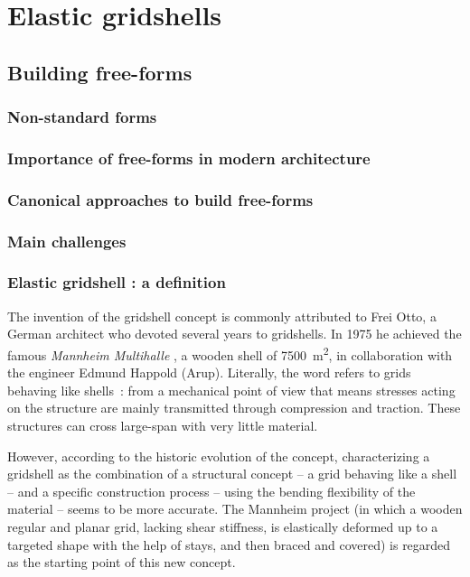 
\chapter{Elastic gridshells}


\section{Building free-forms}
\subsection{Non-standard forms}
\subsection{Importance of free-forms in modern architecture}
\subsection{Canonical approaches to build free-forms}
\subsection{Main challenges}

\subsection{Elastic gridshell : a definition}

The invention of the gridshell concept is commonly attributed to Frei Otto, a German architect who devoted several years to gridshells. In 1975 he achieved the famous \emph{Mannheim Multihalle} \cite{Happold1975}, a wooden shell of 7500~m\textsuperscript{2}, in collaboration with the engineer Edmund Happold (Arup).
Literally, the word  refers to grids behaving like shells~: from a mechanical point of view that means stresses acting on the structure are mainly transmitted through compression and traction. These structures can cross large-span with very little material.

However, according to the historic evolution of the concept, characterizing a gridshell as the combination of a structural concept -- a grid behaving like a shell -- and a specific construction process -- using the bending flexibility of the material -- seems to be more accurate. The Mannheim project (in which a wooden regular and planar grid, lacking shear stiffness, is elastically deformed up to a targeted shape with the help of stays, and then braced and covered) is regarded as the starting point of this new concept.

